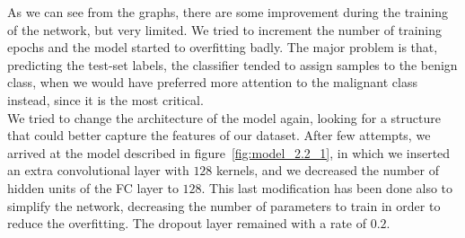 \documentclass[11pt,a4paper,oneside]{article}
\begin{document}
As we can see from the graphs, there are some improvement during the training of the network, but very limited. We tried to increment the number of training epochs and the model started to overfitting badly. The major problem is that, predicting the test-set labels, the classifier tended to assign samples to the benign class, when we would have preferred more attention to the malignant class instead, since it is the most critical.\\


We tried to change the architecture of the model again, looking for a structure that could better capture the features of our dataset. After few attempts, we arrived at the model described in figure~\ref{fig:model_2.2_1}, in which we inserted an extra convolutional layer with $128$ kernels, and we decreased the number of hidden units of the FC layer to $128$. This last modification has been done also to simplify the network, decreasing the number of parameters to train in order to reduce the overfitting. The dropout layer remained with a rate of $0.2$.
\end{document}
